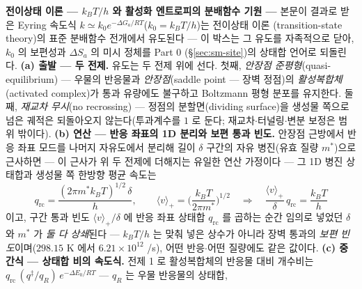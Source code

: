 \begin{bgbox}
\textbf{전이상태 이론 --- $k_BT/h$ 와 활성화 엔트로피의 분배함수 기원 ---}
본문이 결과로 받은 Eyring 속도식 $k\simeq k_0e^{-\Delta G_a/RT}$($k_0=k_BT/h$)는 전이상태 이론
(transition-state theory)의 표준 분배함수 전개에서 유도된다\cite{eyring1935,glasstone1941} --- 이
박스는 그 유도를 자족적으로 닫아, $k_0$ 의 보편성과 $\Delta S_a$ 의 미시 정체를 Part 0
(\S\ref{sec:sm-site})의 상태합 언어로 되돌린다.
\textbf{(a) 출발 --- 두 전제.} 유도는 두 전제 위에 선다\cite{laidlerking1983}. 첫째,
\emph{안장점 준평형}(quasi-equilibrium) --- 우물의 반응물과 \emph{안장점}(saddle point --- 장벽 정점)의
\emph{활성복합체}(activated complex)가 통과 유량에도 불구하고 Boltzmann 평형 분포를 유지한다.
둘째, \emph{재교차 무시}(no recrossing) --- 정점의 분할면(dividing surface)을 생성물 쪽으로 넘은
궤적은 되돌아오지 않는다(투과계수를 $1$ 로 둔다; 재교차$\cdot$터널링$\cdot$변분 보정은 범위 밖이다).
\textbf{(b) 연산 --- 반응 좌표의 1D 분리와 보편 통과 빈도.} 안장점 근방에서 반응 좌표 모드를 나머지
자유도에서 분리해 길이 $\delta$ 구간의 자유 병진(유효 질량 $m^*$)으로 근사하면 --- 이 근사가 위
두 전제에 더해지는 유일한 연산 가정이다 --- 그 1D 병진 상태합과 생성물 쪽 한방향 평균 속도는
\begin{equation}
q_\mathrm{rc}=\frac{(2\pi m^*k_BT)^{1/2}\,\delta}{h},\qquad
\langle v\rangle_{+}=\Big(\frac{k_BT}{2\pi m^*}\Big)^{1/2}
\quad\Longrightarrow\quad
\frac{\langle v\rangle_{+}}{\delta}\,q_\mathrm{rc}=\frac{k_BT}{h}
\label{eq:tst-freq}
\end{equation}
이고, 구간 통과 빈도 $\langle v\rangle_+/\delta$ 에 반응 좌표 상태합 $q_\mathrm{rc}$ 를 곱하는 순간
임의로 넣었던 $\delta$ 와 $m^*$ 가 \emph{둘 다 상쇄}된다 --- $k_BT/h$ 는 맞춰 넣은 상수가 아니라
장벽 통과의 \emph{보편 빈도}이며($298.15$ K 에서 $6.21\times10^{12}$ /s), 어떤 반응$\cdot$어떤
질량에도 같은 값이다. \textbf{(c) 중간식 --- 상태합 비의 속도식.} 전제 1 로 활성복합체의 반응물 대비
개수비는 $q_\mathrm{rc}\,(q^{\ddagger}/q_R)\,e^{-\Delta E_0/RT}$ --- $q_R$ 는 우물 반응물의 상태합,

\end{bgbox}
